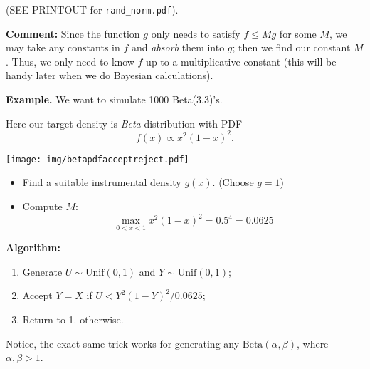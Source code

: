 \documentclass[11pt,english]{scrbook}
\begin{document}
(SEE PRINTOUT for \texttt{rand\_norm.pdf}).

\textbf{Comment:} Since the function \(g\) only needs to satisfy \(f\leq Mg\) for some \(M\), we may take any constants in \(f\) and \emph{absorb} them into \(g\); then we find our constant \(M\). Thus, we only need to know \(f\) up to a multiplicative constant (this will be handy later when we do Bayesian calculations).

\textbf{Example.} We want to simulate 1000 Beta(3,3)'s.

Here our target density is \emph{Beta} distribution with PDF 
\[
f(x)\propto x^{2}(1-x)^{2}.
\]
\begin{center}
\begin{center}
\texttt{[image: img/betapdfacceptreject.pdf]}
\end{center}

\end{center}
\begin{itemize}
\item Find a suitable instrumental density \(g(x)\). (Choose \(g=1\))
\item Compute \(M\): 
\[
   \max_{0<x<1}x^{2}(1-x)^{2}=0.5^{4}=0.0625
   \]
\end{itemize}

\textbf{Algorithm:}
\begin{enumerate}
\item Generate \(U \sim \mathrm{Unif}(0,1)\) and \(Y \sim \mathrm{Unif}(0,1)\);
\item Accept \(Y = X\) if \(U < Y^{2}(1-Y)^{2}/0.0625\);
\item Return to 1. otherwise.
\end{enumerate}

Notice, the exact same trick works for generating any \(\mathrm{Beta}(\alpha,\beta)\), where \(\alpha,\beta>1\).
\end{document}
